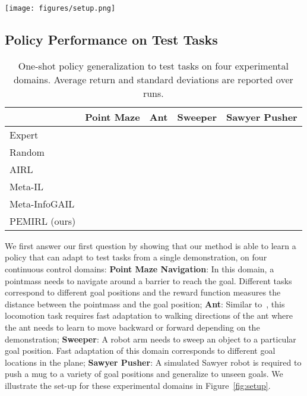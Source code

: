 \begin{figure*}[!t]
    \centering
    \texttt{[image: figures/setup.png]}
\caption{\textbf{Experimental domains} (left to right):
Point-Maze, Ant, Sweeper, and Sawyer Pusher. 
    }
\label{fig:setup}
\end{figure*}

\subsection{Policy Performance on Test Tasks}
\label{sec:imitation_results}

\begin{table}[h]
    \begin{center}
\begin{small}
    \begin{tabular}{l|c|c|c|c}
    \toprule
        & Point Maze & Ant & Sweeper & Sawyer Pusher  \\
      \midrule
      Expert &  &  &  & \\
Random &  &  &  & \\
      \midrule
      AIRL~\cite{fu2017learning} &  &  &  & \\
Meta-IL &  &  &  & \\
Meta-InfoGAIL &  &  &  & \\
PEMIRL (ours) &  &  &  &  \\
      \bottomrule
    \end{tabular}
    \end{small}
    \end{center}
    \vspace{0.2cm}
    \caption{One-shot policy generalization to test tasks on four experimental domains.
    Average return and standard deviations are reported over  runs.}
\label{tbl:imitation_results}
\end{table}

We first answer our first question by showing that our method is able to learn a policy that can adapt to test tasks from a single demonstration, on four continuous control domains: \textbf{Point Maze Navigation}: In this domain, a pointmass needs to navigate around a barrier to reach the goal. Different tasks correspond to different goal positions and the reward function measures the distance between the pointmass and the goal position; \textbf{Ant}: Similar to~\cite{finn2017maml}, this locomotion task requires fast adaptation to walking directions of the ant where the ant needs to learn to move backward or forward depending on the demonstration;
\textbf{Sweeper}: A robot arm needs to sweep an object to a particular goal position. Fast adaptation of this domain corresponds to different goal locations in the plane;
\textbf{Sawyer Pusher}: A simulated Sawyer robot is required to push a mug to a variety of goal positions and generalize to unseen goals.
We illustrate the set-up for these experimental domains in Figure~\ref{fig:setup}. 

